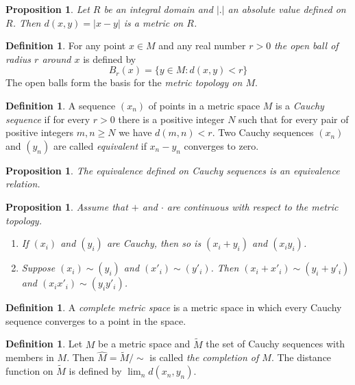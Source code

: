 \documentclass[12pt]{article}
\newtheorem{prop}[thm]{Proposition}
\theoremstyle{definition}
\newtheorem{dfn}[thm]{Definition}
\theoremstyle{remark}
\begin{document}
    \begin{prop}
        Let $R$ be an integral domain and $|.|$ an absolute value defined on $R$. Then $d(x,y)=|x-y|$ is a metric on $R$.
    \end{prop}

    \begin{dfn}
        For any point $x\in M$ and any real number $r>0$ \emph{the open ball of radius $r$ around $x$} is defined by
        $$B_r(x)=\{y\in M : d(x,y) < r\}$$
        The open balls form the basis for the \emph{metric topology on $M$}.
    \end{dfn}

    \begin{dfn}
        A sequence $(x_n)$ of points in a metric space $M$ is a \emph{Cauchy sequence} if for every $r>0$ there is a positive integer $N$ such that for every pair of positive integers $m,n\geq N$ we have $d(m,n)<r$. Two Cauchy sequences $(x_n)$ and $(y_n)$ are called \emph{equivalent} if $x_n-y_n$ converges to zero.
    \end{dfn}

    \begin{prop}
        The equivalence defined on Cauchy sequences is an equivalence relation.
    \end{prop}
    
    \begin{prop}
        Assume that $+$ and $\cdot$ are continuous with respect to the metric topology.
        \begin{enumerate}[label=(\alph*)]
            \item If $(x_i)$ and $(y_i)$ are Cauchy, then so is $(x_i+y_i)$ and $(x_iy_i)$.
            \item Suppose $(x_i)\sim(y_i)$ and $(x'_i)\sim(y'_i)$. Then $(x_i+x'_i)\sim(y_i+y'_i)$ and $(x_ix'_i)\sim(y_iy'_i)$.
        \end{enumerate}
    \end{prop}

    \begin{dfn}
        A \emph{complete metric space} is a metric space in which every Cauchy sequence converges to a point in the space.
    \end{dfn}

    \begin{dfn}
        Let $M$ be a metric space and $\tilde{M}$ the set of Cauchy sequences with members in $M$. Then $\hat{M}=\tilde{M}/\sim$ is called \emph{the completion of $M$}. The distance function on $\tilde{M}$ is defined by $\lim_{n}d(x_n,y_n)$.
    \end{dfn}
\end{document}

